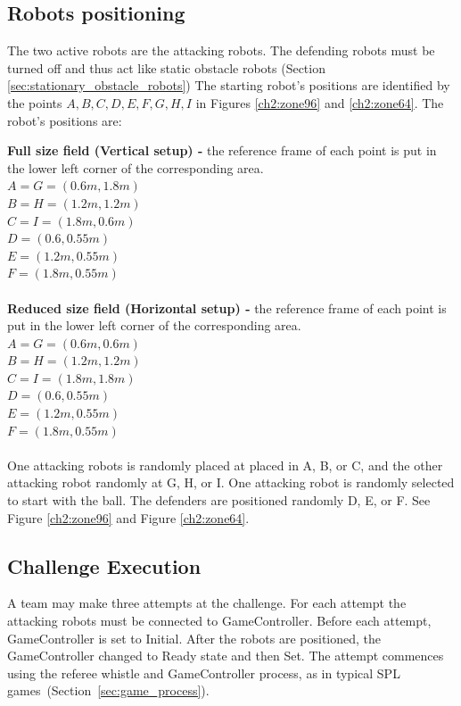 \subsection{Robots positioning}
The two active robots are the attacking robots. The defending robots must be turned off and thus act like static obstacle robots (\cf Section \ref{sec:stationary_obstacle_robots})
The starting robot's positions are identified by the points ${A,B,C,D,E,F,G,H,I}$ in Figures \ref{ch2:zone96} and \ref{ch2:zone64}.
The robot's positions are:

\textbf{Full size field (Vertical setup) -} the reference frame of each point is put in the lower left corner of the corresponding area.
\\
$A = G = (0.6m, 1.8m)$
\\
$B = H = (1.2m, 1.2m)$
\\
$C = I = (1.8m, 0.6m)$
\\
$D = (0.6, 0.55m)$
\\
$E = (1.2m, 0.55m)$
\\
$F = (1.8m, 0.55m)$
\\
\\
\textbf{Reduced size field (Horizontal setup) -} the reference frame of each point is put in the lower left corner of the corresponding area.
\\
$A = G = (0.6m, 0.6m)$
\\
$B = H = (1.2m, 1.2m)$
\\
$C = I = (1.8m, 1.8m)$
\\
$D = (0.6, 0.55m)$
\\
$E = (1.2m, 0.55m)$
\\
$F = (1.8m, 0.55m)$
\\
\\
One attacking robots is randomly placed at placed in A, B, or C, and the other attacking robot randomly at G, H, or I.  One attacking robot is randomly selected to start with the ball. The defenders are positioned randomly D, E, or F.
See Figure \ref{ch2:zone96} and Figure \ref{ch2:zone64}.

\subsection{Challenge Execution}
A team may make three attempts at the challenge. For each attempt the attacking robots must be connected to GameController.
Before each attempt, GameController is set to Initial. After the robots are positioned, the GameController changed to Ready state and then Set. The attempt commences using the referee whistle and GameController process, as in typical SPL games~(\cf Section~\ref{sec:game_process}). 

